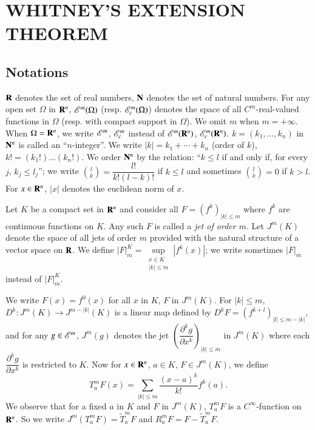 \chapter{WHITNEY'S EXTENSION THEOREM}\label{chap1}
\pageoriginale
\section{Notations}\label{chap1-sec1}

$\mathbf{R}$ denotes the set of real numbers, $\mathbf{N}$ denotes the set of natural numbers. For any open set $\Omega$ in $\mathbf{R}^{n}$, $\mathscr{E}^{m}(\Omega)$ (resp. $\mathscr{E}^{m}_{c}(\Omega)$) denotes the space of all $C^{m}$-real-valued functions in $\Omega$ (resp. with compact support in $\Omega$). We omit $m$ when $m=+\infty$. When $\Omega=\mathbf{R}^{n}$, we write $\mathscr{E}^{m}$, $\mathscr{E}^{m}_{c}$ instead of $\mathscr{E}^{m}(\mathbf{R}^{n})$, $\mathscr{E}^{m}_{c}(\mathbf{R}^{n})$. $k=(k_{1},\ldots,k_{n})$ in $\mathbf{N}^{n}$ is called an ``$n$-integer''. We write $|k|=k_{1}+\cdots+k_{n}$ (order of $k$), $k!=(k_{1}!)\ldots(k_{n}!)$. We order $\mathbf{N}^{n}$ by the relation: ``$k\leq l$ if and only if, for every $j$, $k_{j}\leq l_{j}$''; we write $\binom{l}{k}=\dfrac{l!}{k!(l-k)!}$ if $k\leq l$ and sometimes $\binom{l}{k}=0$ if $k>l$. For $x\in \mathbf{R}^{n}$, $|x|$ denotes the euclidean norm of $x$.

Let $K$ be a compact set in $\mathbf{R}^{n}$ and consider all $F=(f^{k})_{|k|\leq m}$ where $f^{k}$ are continuous functions on $K$. Any such $F$ is called a {\em jet of order $m$}. Let $J^{m}(K)$ denote the space of all jets of order $m$ provided with the natural structure of a vector space on $\mathbf{R}$. We define $|F|^{K}_{m}=\sup\limits_{\substack{x\in K\\ |k|\leq m}}|f^{k}(x)|$; we write sometimes $|F|_{m}$ instead of $|F|^{K}_{m}$.

We write $F(x)=f^{0}(x)$ for all $x$ in $K$, $F$ in $J^{m}(K)$. For $|k|\leq m$, $D^{k}:J^{m}(K)\to J^{m-|k|}(K)$ is a linear map defined by $D^{k}F=(f^{k+l})_{|l|\leq m-|k|}$, and for any $g\in \mathscr{E}^{m}$, $J^{m}(g)$ denotes the jet $\left(\dfrac{\partial^{k}g}{\partial x^{k}}\right)_{|k|\leq m}$ in $J^{m}(K)$ where each $\dfrac{\partial^{k}g}{\partial x^{k}}$ is restricted to $K$. Now for $x\in \mathbf{R}^{n}$, $a\in K$, $F\in J^{m}(K)$, we define
$$
T^{m}_{a}F(x)=\sum\limits_{|k|\leq m}\dfrac{(x-a)^{k}}{k!}f^{k}(a).
$$
We observe that for a fixed $a$ in $K$ and $F$ in $J^{m}(K)$, $T^{m}_{a}F$ is a $C^{\infty}$-function on $\mathbf{R}^{n}$. So we write $J^{m}(T^{m}_{a}F)=\widetilde{T}^{m}_{a}F$ and $R^{m}_{a}F=F-\widetilde{T}^{m}_{a}F$.

